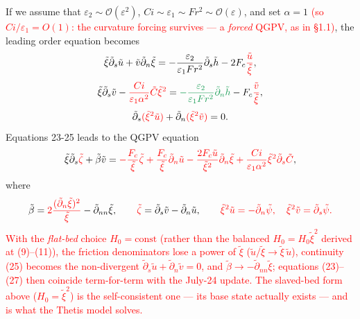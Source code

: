\documentclass[11pt]{article}
\newcommand{\R}[1]{\textcolor{red}{#1}}
\newcommand{\G}[1]{\textcolor{ForestGreen}{#1}}
\newcommand{\dt}{\tilde{\partial}}
\begin{document}
If we assume that $\varepsilon_2\sim\mathcal{O}(\varepsilon^2)$,
$Ci\sim\varepsilon_1\sim Fr^2\sim\mathcal{O}(\varepsilon)$, and set $\alpha=1$
\R{(so $Ci/\varepsilon_1=O(1)$: the curvature forcing survives --- a
\emph{forced} QGPV, as in §1.1)}, the leading order equation becomes
\begin{equation}
\tilde\xi\dt_s\tilde u+\tilde v\dt_n\tilde\xi
= -\frac{\varepsilon_2}{\varepsilon_1Fr^2}\dt_s\tilde h
  - 2F_c\R{\frac{\tilde u}{\tilde\xi}},
\end{equation}
\begin{equation}
\tilde\xi\dt_s\tilde v
 - \R{\frac{Ci}{\varepsilon_1\alpha^2}\tilde C\tilde\xi^2}
= \G{-\frac{\varepsilon_2}{\varepsilon_1Fr^2}\dt_n\tilde h}
  - F_c\R{\frac{\tilde v}{\tilde\xi}},
\end{equation}
\begin{equation}
\dt_s\R{(\tilde\xi^2\tilde u)}+\dt_n\R{(\tilde\xi^2\tilde v)} = 0 .
\end{equation}
Equations 23-25 leads to the QGPV equation
\begin{equation}
\tilde\xi\dt_s\R{\tilde\zeta}+\tilde\beta\tilde v
= \R{-\frac{F_c}{\tilde\xi}\tilde\zeta
    + \frac{F_c}{\tilde\xi}\dt_n\tilde u
    - \frac{2F_c\tilde u}{\tilde\xi^{2}}\dt_n\tilde\xi
    + \frac{Ci}{\varepsilon_1\alpha^2}\tilde\xi^2\dt_s\tilde C},
\end{equation}
where
\begin{equation}
\tilde\beta=\R{2\frac{(\dt_n\tilde\xi)^2}{\tilde\xi}}-\dt_{nn}\tilde\xi,\qquad
\R{\tilde\zeta}=\dt_s\tilde v-\dt_n\tilde u,\qquad
\R{\tilde\xi^2\tilde u=-\dt_n\tilde\psi,\quad
   \tilde\xi^2\tilde v=\dt_s\tilde\psi .}
\end{equation}
\R{With the \emph{flat-bed} choice $H_0=\mathrm{const}$ (rather than the balanced
$H_0=H_0\tilde\xi^2$ derived at (9)--(11)), the friction denominators lose a
power of $\tilde\xi$ ($\tilde u/\tilde\xi\to\tilde\xi\,\tilde u$), continuity (25)
becomes the non-divergent $\dt_s\tilde u+\dt_n\tilde v=0$, and
$\tilde\beta\to-\dt_{nn}\tilde\xi$; equations (23)--(27) then coincide
term-for-term with the July-24 update. The slaved-bed form above ($H_0=\tilde\xi^2$)
is the self-consistent one --- its base state actually exists --- and is what the
Thetis model solves.}
\end{document}
